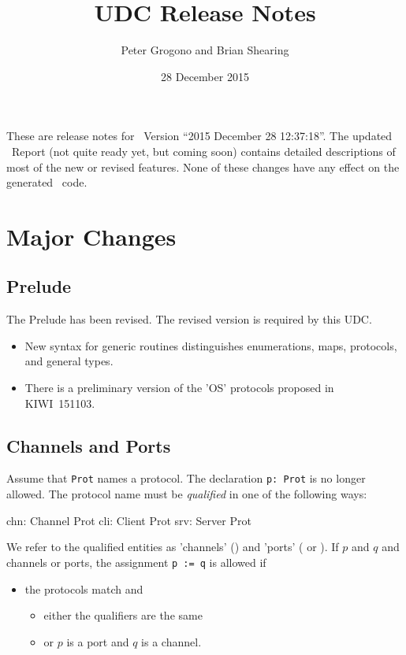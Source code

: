 \documentclass{scrartcl}
\begin{document}
\title{UDC Release Notes}
\author{Peter Grogono and Brian Shearing}
\date{28 December 2015}
\maketitle


These are release notes for \udc\ Version ``2015 December 28 12:37:18''.  The updated \desi\ Report (not quite ready yet, but coming soon) contains detailed descriptions of most of the new or revised features.  None of these changes have any effect on the generated \dil\ code.


\section{Major Changes}


\subsection{Prelude}

The Prelude has been revised.  The revised version is required by this UDC.
\begin{itemize}
	\item New syntax for generic routines distinguishes enumerations, maps, protocols, and general types.
	\item There is a preliminary version of the 'OS' protocols proposed in KIWI~151103.
\end{itemize}



\subsection{Channels and Ports}

Assume that \lstinline'Prot' names a protocol.  The declaration \lstinline'p: Prot' is no longer allowed.  The protocol name must be \emph{qualified} in one of the following ways:
\begin{code}
	chn: Channel Prot
	cli: Client Prot
	srv: Server Prot
\end{code}
	
We refer to the qualified entities as 'channels' () and 'ports' ( or ).  If $p$ and $q$ and channels or ports, the assignment	\lstinline'p := q' is allowed if
\begin{itemize}
	\item the protocols match and 
    \begin{itemize}
        \item either the qualifiers are the same
        \item or $p$ is a port and $q$ is a channel.
    \end{itemize}
\end{itemize} 
	
\end{document}
